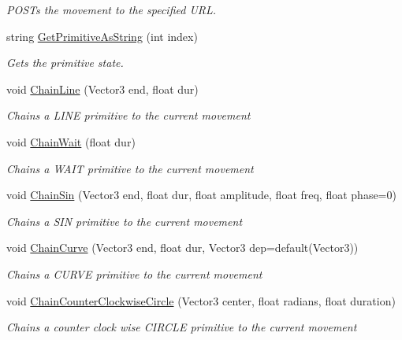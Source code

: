 \begin{DoxyCompactItemize}
\begin{DoxyCompactList}\small\item\em P\+O\+S\+Ts the movement to the specified U\+R\+L. \end{DoxyCompactList}\item 
string \hyperlink{class_movement_af5274f1a899366c90fbc9b24a1964a4a}{Get\+Primitive\+As\+String} (int index)
\begin{DoxyCompactList}\small\item\em Gets the primitive state. \end{DoxyCompactList}\item 
void \hyperlink{class_movement_a036648cd77490757e878a2d9f17b073f}{Chain\+Line} (Vector3 end, float dur)
\begin{DoxyCompactList}\small\item\em Chains a L\+I\+N\+E primitive to the current movement \end{DoxyCompactList}\item 
void \hyperlink{class_movement_ac8fd06c5dca30b33499adc9841ad9e09}{Chain\+Wait} (float dur)
\begin{DoxyCompactList}\small\item\em Chains a W\+A\+I\+T primitive to the current movement \end{DoxyCompactList}\item 
void \hyperlink{class_movement_ad255d1f23362791b6362db58af022a71}{Chain\+Sin} (Vector3 end, float dur, float amplitude, float freq, float phase=0)
\begin{DoxyCompactList}\small\item\em Chains a S\+I\+N primitive to the current movement \end{DoxyCompactList}\item 
void \hyperlink{class_movement_a0b0c7ec620acd4510701a540bc384734}{Chain\+Curve} (Vector3 end, float dur, Vector3 dep=default(Vector3))
\begin{DoxyCompactList}\small\item\em Chains a C\+U\+R\+V\+E primitive to the current movement \end{DoxyCompactList}\item 
void \hyperlink{class_movement_a44030724ddbaa272931c3cf875e472be}{Chain\+Counter\+Clockwise\+Circle} (Vector3 center, float radians, float duration)
\begin{DoxyCompactList}\small\item\em Chains a counter clock wise C\+I\+R\+C\+L\+E primitive to the current movement \end{DoxyCompactList}\item 

\end{DoxyCompactItemize}
